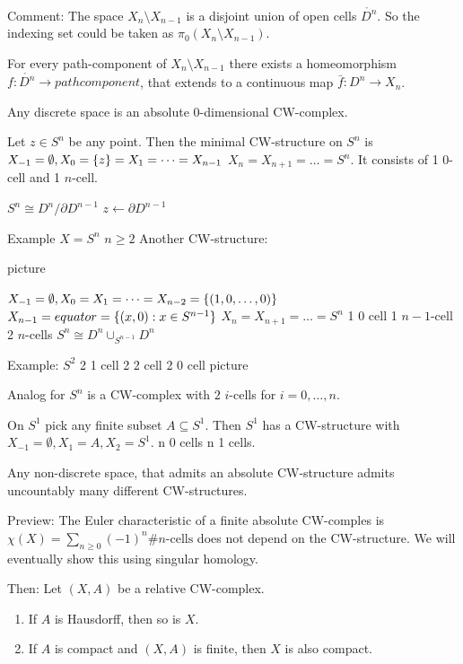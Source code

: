 \documentclass{TemplateLecture}
\begin{document}
Comment: The space \(X_n \setminus X_{n-1}\) is a disjoint union of open cells \(\mathring{D^n}\). So the indexing set could be taken as \(\pi_0(X_n\setminus X_{n-1})\).

For every path-component of \(X_n \setminus X_{n-1}\) there exists a homeomorphism \(f \colon \mathring{D^n} \to pathcomponent\), that extends to a continuous map \(\bar f \colon D^n \to X_n\).


\begin{example}
    Any discrete space is an absolute \(0\)-dimensional CW-complex.

    Let \(z \in S^n\) be any point. Then  the minimal CW-structure on \(S^n\) is \(X_{-1} = \emptyset, X_0 = \{z\} = X_1 = \dots = X_{n-1}\) \(X_n = X_{n+1} = \dots = S^n\). It consists of 1 \(0\)-cell and 1 \(n\)-cell. 

    \(S^n \cong D^n / \partial D^{n-1}\) \(z \leftarrow \partial D^{n-1}\)

    Example \(X = S^n\) \(n \geq 2\) Another CW-structure:

    picture

    \(X_{-1} = \emptyset, X_0 = X_1 = \dots = X_{n-2} = \{(1,0,\dots, 0)\}\) \(X_{n-1} = equator = \{(x,0) : x \in S^{n-1}\}\)
    \(X_n = X_{n+1} = \dots = S^n\)
    1 0 cell 1  \(n-1\)-cell 2 \(n\)-cells
    \(S^n \cong D^n \cup_{S^{n-1}} D^n\)

    Example: \(S^2\) 2 1 cell 2 2 cell 2 0 cell 
    picture

    Analog for \(S^n\) is a CW-complex with \(2\) \(i\)-cells for \(i = 0, \dots, n\).

    On \(S^1\) pick any finite subset \(A \subseteq S^1\). Then \(S^1\) has a CW-structure with \(X_{-1} = \emptyset, X_1 = A, X_2 = S^1\). n 0 cells n 1 cells.

    Any non-discrete space, that admits an absolute CW-structure admits uncountably many different CW-structures.

    Preview: The Euler characteristic of a finite absolute CW-comples is \(\chi(X) = \sum_{n \geq 0} (-1)^n \#n\text{-cells}\) does not depend on the CW-structure. We will eventually show this using singular homology. 
\end{example}

Then: Let \((X,A)\) be a relative CW-complex.
\begin{enumerate}
    \item If \(A\) is Hausdorff, then so is \(X\).
    \item If \(A\) is compact and \((X,A)\) is finite, then \(X\) is also compact.
\end{enumerate}
\end{document}
